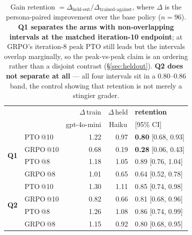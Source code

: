 \begin{table}[t]
\centering\small
\setlength{\tabcolsep}{3pt}
\begin{tabular}{@{}llrrl@{}}
\toprule
& & $\Delta$\,train & $\Delta$\,held & \textbf{retention} \\
& & \multicolumn{1}{c}{\footnotesize gpt-4o-mini} & \multicolumn{1}{c}{\footnotesize Haiku} & \footnotesize [95\% CI] \\
\midrule
\multirow{4}{*}{\textbf{Q1}}
 & PTO\,@10  & 1.22 & 0.97 & \textbf{0.80} [0.68, 0.93] \\
 & GRPO\,@10 & 0.68 & 0.19 & \textbf{0.28} [0.06, 0.43] \\
 & PTO\,@8   & 1.18 & 1.05 & 0.89 [0.76, 1.04] \\
 & GRPO\,@8  & 1.01 & 0.65 & 0.64 [0.52, 0.78] \\
\midrule
\multirow{4}{*}{\textbf{Q2}}
 & PTO\,@10  & 1.30 & 1.11 & 0.85 [0.74, 0.98] \\
 & GRPO\,@10 & 0.82 & 0.66 & 0.81 [0.68, 0.96] \\
 & PTO\,@8   & 1.26 & 1.08 & 0.86 [0.74, 0.99] \\
 & GRPO\,@8  & 1.15 & 0.92 & 0.80 [0.68, 0.95] \\
\bottomrule
\end{tabular}
\caption{Gain retention $=\Delta_\text{held-out}/\Delta_\text{trained-against}$, where
$\Delta$ is the persona-paired improvement over the base policy ($n=96$). \textbf{Q1 separates
the arms with non-overlapping intervals at the matched iteration-10 endpoint}; at GRPO's
iteration-8 peak PTO still leads but the intervals overlap marginally, so the peak-vs-peak
claim is an ordering rather than a disjoint contrast (\S\ref{sec:heldout}). \textbf{Q2 does not
separate at all} --- all four intervals sit in a $0.80$--$0.86$ band, the control showing that
retention is not merely a stingier grader.}
\label{tab:retention}
\end{table}
